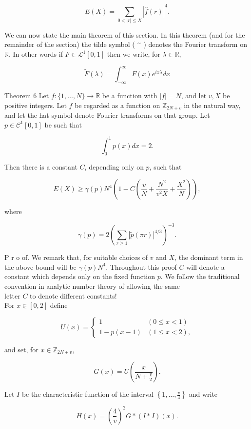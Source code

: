 \documentclass[10pt]{article}
\begin{document}
$$
E(X)=\sum_{0<|r| \leq X}|\hat{f}(r)|^{4} .
$$

We can now state the main theorem of this section. In this theorem (and for the remainder of the section) the tilde symbol ( ${ }^{\sim}$ ) denotes the Fourier transform on $\mathbb{R}$. In other words if $F \in \mathcal{L}^{1}[0,1]$ then we write, for $\lambda \in \mathbb{R}$,

$$
\tilde{F}(\lambda)=\int_{-\infty}^{\infty} F(x) e^{i x \lambda} d x
$$

Theorem 6 Let $f:\{1, \ldots, N\} \rightarrow \mathbb{R}$ be a function with $|f|=N$, and let $v, X$ be positive integers. Let $f$ be regarded as a function on $\mathbb{Z}_{2 N+v}$ in the natural way, and let the hat symbol denote Fourier transforms on that group. Let $p \in \mathcal{C}^{1}[0,1]$ be such that

$$
\int_{0}^{1} p(x) d x=2 .
$$

Then there is a constant $C$, depending only on $p$, such that

$$
E(X) \geq \gamma(p) N^{4}\left(1-C\left(\frac{v}{N}+\frac{N^{2}}{v^{2} X}+\frac{X^{2}}{N}\right)\right),
$$

where

$$
\gamma(p)=2\left(\sum_{r \geq 1}|\tilde{p}(\pi r)|^{4 / 3}\right)^{-3} .
$$

P r o of. We remark that, for suitable choices of $v$ and $X$, the dominant term in the above bound will be $\gamma(p) N^{4}$. Throughout this proof $C$ will denote a constant which depends only on the fixed function $p$. We follow the traditional convention in analytic number theory of allowing the same\\
letter $C$ to denote different constants!\\
For $x \in[0,2]$ define

\[
U(x)= \begin{cases}1 & (0 \leq x<1)  \tag{16}\\ 1-p(x-1) & (1 \leq x<2),\end{cases}
\]

and set, for $x \in \mathbb{Z}_{2 N+v}$,


\begin{equation*}
G(x)=U\left(\frac{x}{N+\frac{v}{2}}\right) . \tag{17}
\end{equation*}


Let $I$ be the characteristic function of the interval $\left\{1, \ldots, \frac{v}{4}\right\}$ and write


\begin{equation*}
H(x)=\left(\frac{4}{v}\right)^{2} G *(I * I)(x) . \tag{18}
\end{equation*}
\end{document}
